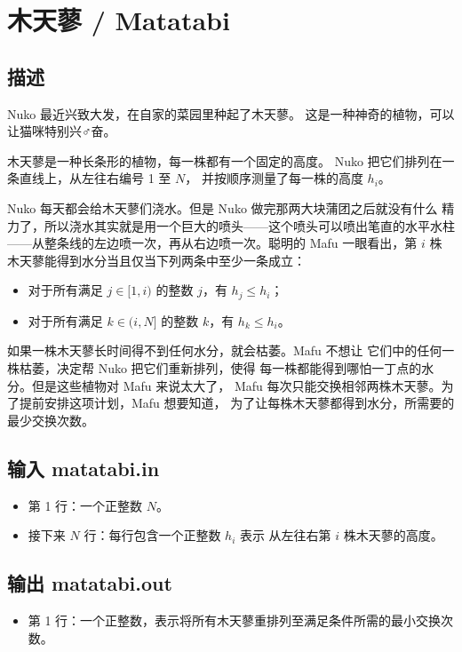 \documentclass[UTF8, 11pt, a4paper]{article}
\begin{document}
\section*{木天蓼 / Matatabi}

\subsection*{描述}
Nuko 最近兴致大发，在自家的菜园里种起了木天蓼。%
这是一种神奇的植物，可以让猫咪特别兴♂奋。

木天蓼是一种长条形的植物，每一株都有一个固定的高度。%
Nuko 把它们排列在一条直线上，从左往右编号 1 至 $N$，%
并按顺序测量了每一株的高度 $h_i$。

Nuko 每天都会给木天蓼们浇水。但是 Nuko 做完那两大块蒲团之后就没有什么%
精力了，所以浇水其实就是用一个巨大的喷头——这个喷头可以喷出笔直的水平水柱%
——从整条线的左边喷一次，再从右边喷一次。聪明的 Mafu 一眼看出，第 $i$ 株%
木天蓼能得到水分当且仅当下列两条中至少一条成立：
\begin{itemize}
    \item 对于所有满足 $j \in [1, i)$ 的整数 $j$，有 $h_j \leq h_i$；
    \item 对于所有满足 $k \in (i, N]$ 的整数 $k$，有 $h_k \leq h_i$。
\end{itemize}

如果一株木天蓼长时间得不到任何水分，就会枯萎。Mafu 不想让%
它们中的任何一株枯萎，决定帮 Nuko 把它们重新排列，使得%
每一株都能得到哪怕一丁点的水分。但是这些植物对 Mafu 来说太大了，%
Mafu 每次只能交换相邻两株木天蓼。为了提前安排这项计划，Mafu 想要知道，%
为了让每株木天蓼都得到水分，所需要的最少交换次数。

\subsection*{输入 \makebox[0.5em]{} \small{matatabi.in}}
\begin{itemize}
    \item 第 1 行：一个正整数 $N$。
    \item 接下来 $N$ 行：每行包含一个正整数 $h_i$ 表示%
        从左往右第 $i$ 株木天蓼的高度。
\end{itemize}

\subsection*{输出 \makebox[0.5em]{} \small{matatabi.out}}
\begin{itemize}
    \item 第 1 行：一个正整数，表示将所有木天蓼重排列至满足条件所需的最小交换次数。
\end{itemize}
\end{document}
